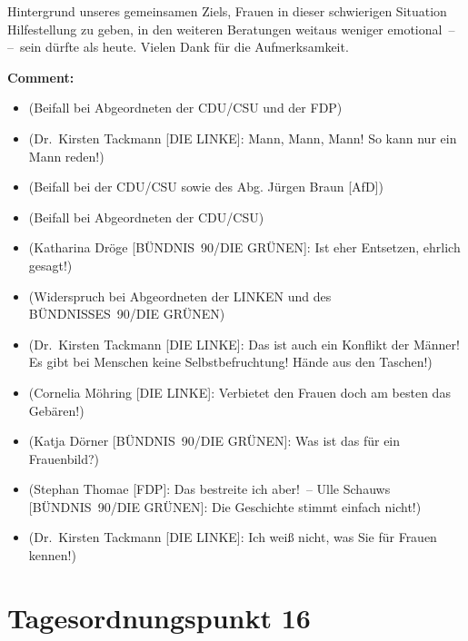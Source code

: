 \documentclass{article}
\begin{document}
Hintergrund unseres gemeinsamen Ziels, Frauen in dieser schwierigen Situation Hilfestellung zu geben, in den weiteren Beratungen weitaus weniger emotional – – sein dürfte als heute. Vielen Dank für die Aufmerksamkeit. 

\noindent\textbf{Comment:}
\begin{itemize}
    \setlength\itemsep{-3pt}
    \item (Beifall bei Abgeordneten der CDU/CSU und der FDP)
    \setlength\itemsep{-3pt}
    \item (Dr. Kirsten Tackmann [DIE LINKE]: Mann, Mann, Mann! So kann nur ein Mann reden!)
    \setlength\itemsep{-3pt}
    \item (Beifall bei der CDU/CSU sowie des Abg. Jürgen Braun [AfD])
    \setlength\itemsep{-3pt}
    \item (Beifall bei Abgeordneten der CDU/CSU)
    \setlength\itemsep{-3pt}
    \item (Katharina Dröge [BÜNDNIS 90/DIE GRÜNEN]: Ist eher Entsetzen, ehrlich gesagt!)
    \setlength\itemsep{-3pt}
    \item (Widerspruch bei Abgeordneten der LINKEN und des BÜNDNISSES 90/DIE GRÜNEN)
    \setlength\itemsep{-3pt}
    \item (Dr. Kirsten Tackmann [DIE LINKE]: Das ist auch ein Konflikt der Männer! Es gibt bei Menschen keine Selbstbefruchtung! Hände aus den Taschen!)
    \setlength\itemsep{-3pt}
    \item (Cornelia Möhring [DIE LINKE]: Verbietet den Frauen doch am besten das Gebären!)
    \setlength\itemsep{-3pt}
    \item (Katja Dörner [BÜNDNIS 90/DIE GRÜNEN]: Was ist das für ein Frauenbild?)
    \setlength\itemsep{-3pt}
    \item (Stephan Thomae [FDP]: Das bestreite ich aber! – Ulle Schauws [BÜNDNIS 90/DIE GRÜNEN]: Die Geschichte stimmt einfach nicht!)
    \setlength\itemsep{-3pt}
    \item (Dr. Kirsten Tackmann [DIE LINKE]: Ich weiß nicht, was Sie für Frauen kennen!)
\end{itemize}
\section{Tagesordnungspunkt 16}
\end{document}
